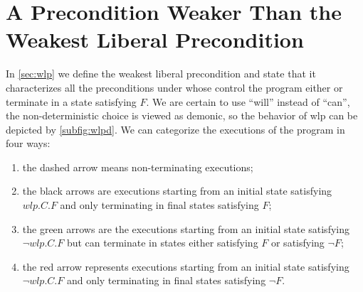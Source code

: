\section{A Precondition Weaker Than the Weakest Liberal Precondition}
In \autoref{sec:wlp} we define the weakest liberal precondition and state that it characterizes all the preconditions under whose control the program either  or  terminate in a state satisfying $F$. 
We are certain to use ``will'' instead of ``can'', the non-deterministic choice is viewed as demonic, so the behavior of wlp can be depicted by \autoref{subfig:wlpd}. 
We can categorize the executions of the program in four ways: 
\begin{enumerate}
	\item the dashed arrow means non-terminating executions; 
	\item the black arrows are executions starting from an initial state satisfying $wlp.C.F$ and only terminating in final states satisfying $F$; 
	\item the green arrows are the executions starting from an initial state satisfying $\neg wlp.C.F$ but can terminate in states either satisfying $F$ or satisfying $\neg F$;
	\item the red arrow represents executions starting from an initial state satisfying $\neg wlp.C.F$ and only terminating in final states satisfying $\neg F$. 
\end{enumerate}


